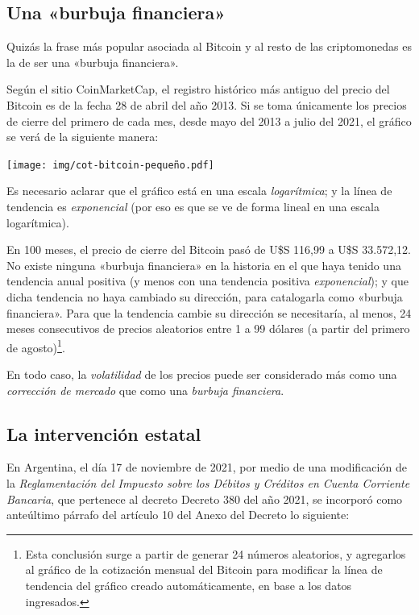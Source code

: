 \documentclass[12pt,a4paper,twoside]{book}
\begin{document}
\subsection{Una «burbuja financiera»}
Quizás la frase más popular asociada al Bitcoin y al resto de las criptomonedas es la de ser una «burbuja financiera».

Según el sitio CoinMarketCap, el registro histórico más antiguo del precio del Bitcoin es de la fecha 28 de abril del año 2013. Si se toma únicamente los precios de cierre del primero de cada mes, desde mayo del 2013 a julio del 2021, el gráfico se verá de la siguiente manera:

\begin{center}
\texttt{[image: img/cot-bitcoin-pequeño.pdf]}
\end{center}

Es necesario aclarar que el gráfico está en una escala \textit{logarítmica}; y la línea de tendencia es \textit{exponencial} (por eso es que se ve de forma lineal en una escala logarítmica).

En 100 meses, el precio de cierre del Bitcoin pasó de U\$S 116,99 a U\$S 33.572,12. No existe ninguna «burbuja financiera» en la historia en el que haya tenido una tendencia anual positiva (y menos con una tendencia positiva \textit{exponencial}); y que dicha tendencia no haya cambiado su dirección, para catalogarla como «burbuja financiera». Para que la tendencia cambie su dirección se necesitaría, al menos, 24 meses consecutivos de precios aleatorios entre 1 a 99 dólares (a partir del primero de agosto)\footnote{Esta conclusión surge a partir de generar 24 números aleatorios, y agregarlos al gráfico de la cotización mensual del Bitcoin para modificar la línea de tendencia del gráfico creado automáticamente, en base a los datos ingresados.}.

En todo caso, la \textit{volatilidad} de los precios puede ser considerado más como una \textit{corrección de mercado} que como una \textit{burbuja financiera}.

\subsection{La intervención estatal}
En Argentina, el día 17 de noviembre de 2021, por medio de una modificación de la \textit{Reglamentación del Impuesto sobre los Débitos y Créditos en Cuenta Corriente Bancaria}, que pertenece al decreto Decreto 380 del año 2021, se incorporó como anteúltimo párrafo del artículo 10 del Anexo del Decreto lo siguiente:
\end{document}
